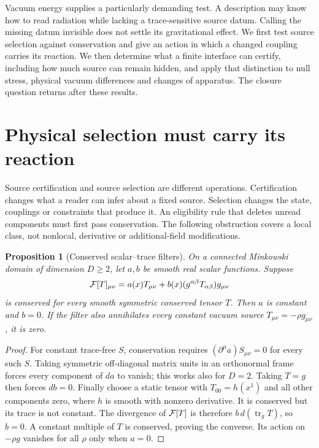 \documentclass[12pt,a4paper]{article}
\newtheorem{proposition}[theorem]{Proposition}
\theoremstyle{definition}
\newcommand{\tr}{\operatorname{tr}}
\begin{document}
Vacuum energy supplies a particularly demanding test. A description may
know how to read radiation while lacking a trace-sensitive source datum.
Calling the missing datum invisible does not settle its gravitational
effect. We first test source selection against conservation and give an
action in which a changed coupling carries its reaction. We then
determine what a finite interface can certify, including how much source
can remain hidden, and apply that distinction to null stress, physical
vacuum differences and changes of apparatus. The closure question
returns after these results.

\section{Physical selection must carry its reaction}
\label{sec:dynamic-source}

Source certification and source selection are different operations.
Certification changes what a reader can infer about a fixed source.
Selection changes the state, couplings or constraints that produce it.
An eligibility rule that deletes unread components must first pass conservation.
The following obstruction covers a local class, not nonlocal, derivative or additional-field modifications.

\begin{proposition}[Conserved scalar--trace filters]
\label{prop:local-filter}
On a connected Minkowski domain of dimension $D\geq2$, let $a,b$ be smooth real scalar functions. Suppose
\[
 {\cal F}[T]_{\mu\nu}=a(x)T_{\mu\nu}+b(x)(g^{\alpha\beta}T_{\alpha\beta})g_{\mu\nu}
\]
is conserved for every smooth symmetric conserved tensor $T$.
Then $a$ is constant and $b=0$. If the filter also annihilates every constant vacuum source $T_{\mu\nu}=-\rho g_{\mu\nu}$, it is zero.
\end{proposition}
\begin{proof}
For constant trace-free $S$, conservation requires $(\partial^\mu a)S_{\mu\nu}=0$ for every such $S$.
Taking symmetric off-diagonal matrix units in an orthonormal frame forces every component of $da$ to vanish; this works also for $D=2$.
Taking $T=g$ then forces $db=0$.
Finally choose a static tensor with $T_{00}=h(x^1)$ and all other components zero, where $h$ is smooth with nonzero derivative.
It is conserved but its trace is not constant. The divergence of ${\cal F}[T]$ is therefore $b\,d(\tr_g T)$, so $b=0$.
A constant multiple of $T$ is conserved, proving the converse.
Its action on $-\rho g$ vanishes for all $\rho$ only when $a=0$.
\end{proof}
\end{document}
